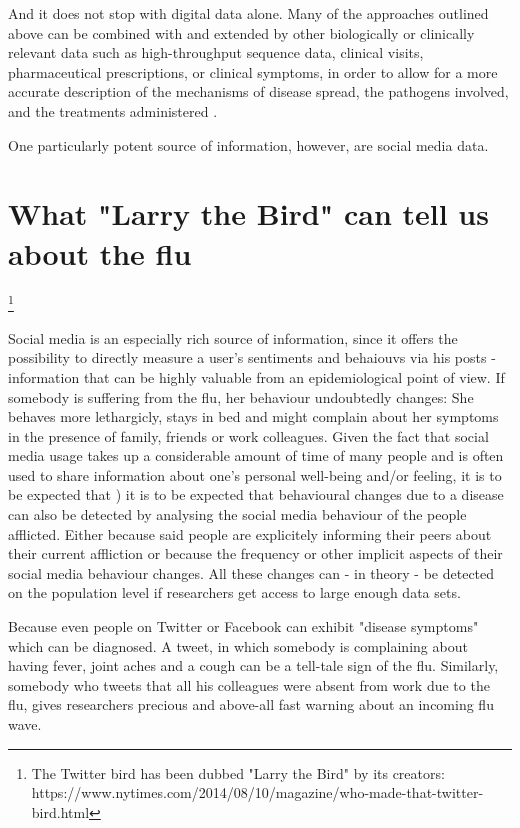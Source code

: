 \documentclass[11pt, a4paper]{report}\usepackage[]{graphicx}\usepackage[]{color}
\begin{document}
And it does not stop with digital data alone. Many of the approaches outlined above can be combined with and extended by other biologically or clinically relevant data such as high-throughput sequence data, clinical visits, pharmaceutical prescriptions, or clinical symptoms, in order to allow for a more accurate description of the mechanisms of disease spread, the pathogens involved, and the treatments administered \citep{ray_network_2016}.

One particularly potent source of information, however, are social media data.\newline

\section{What "Larry the Bird" can tell us about the flu}\footnote{The Twitter bird has been dubbed "Larry the Bird" by its creators: https://www.nytimes.com/2014/08/10/magazine/who-made-that-twitter-bird.html}

Social media is an especially rich source of information, since it offers the possibility to directly measure a user's sentiments and behaiouvs via his posts - information that can be highly valuable from an epidemiological point of view. If somebody is suffering from the flu, her behaviour undoubtedly changes: She behaves more lethargicly, stays in bed and might complain about her symptoms in the presence of family, friends or work colleagues. Given the fact that social media usage takes up a considerable amount of time of many people and is often used to share information about one's personal well-being and/or feeling, it is to be expected that 
\citep{scott_time_2017}) it is to be expected that behavioural changes due to a disease can also be detected by analysing the social media behaviour of the people afflicted. Either because said people are explicitely informing their peers about their current affliction or because the frequency or other implicit aspects of their social media behaviour changes. All these changes can - in theory - be detected on the population level if researchers get access to large enough data sets. 

Because even people on Twitter or Facebook can exhibit "disease symptoms" which can be diagnosed. A tweet, in which somebody is complaining about having fever, joint aches and a cough can be a tell-tale sign of the flu. Similarly, somebody who tweets that all his colleagues were absent from work due to the flu, gives researchers precious and above-all fast warning about an incoming flu wave.\newline
\end{document}
